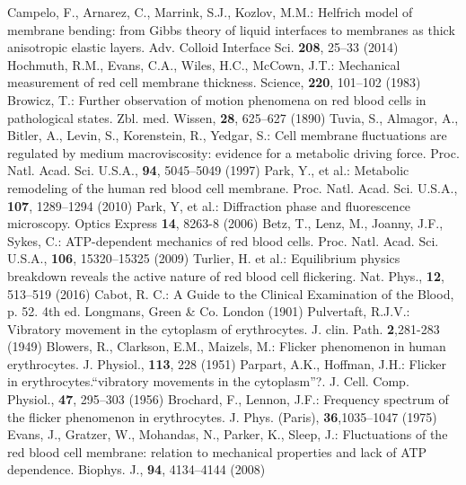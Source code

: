 \documentclass[graybox]{svmult}
\begin{document}
\begin{thebibliography}{99.}%
%
%
Campelo, F., Arnarez, C., Marrink, S.J., Kozlov, M.M.: Helfrich model of membrane bending: from Gibbs theory of liquid interfaces to membranes as thick anisotropic elastic layers. Adv. Colloid Interface Sci. \textbf{208}, 25--33 (2014)
%
Hochmuth, R.M., Evans, C.A., Wiles, H.C., McCown, J.T.: Mechanical measurement of red cell membrane thickness. Science, \textbf{220}, 101--102  (1983)
%
Browicz, T.: Further observation of motion phenomena on red blood cells in pathological states. Zbl. med. Wissen, \textbf{28}, 625--627 (1890)
%
Tuvia, S., Almagor, A., Bitler, A., Levin, S., Korenstein, R., Yedgar, S.: Cell membrane fluctuations are regulated by medium macroviscosity: evidence for a metabolic driving force. Proc. Natl. Acad. Sci. U.S.A., \textbf{94}, 5045--5049 (1997)
%
Park, Y., et al.: Metabolic remodeling of the human red blood cell membrane. Proc. Natl. Acad. Sci. U.S.A., \textbf{107}, 1289--1294 (2010)
%
Park, Y, et al.: Diffraction phase and fluorescence microscopy. Optics Express \textbf{14}, 8263-8 (2006)
%
Betz, T., Lenz, M., Joanny, J.F., Sykes, C.: ATP-dependent mechanics of red blood cells. Proc. Natl. Acad. Sci. U.S.A., \textbf{106}, 15320--15325 (2009)
%
Turlier, H. et al.: Equilibrium physics breakdown reveals the active nature of red blood cell flickering. Nat. Phys., \textbf{12}, 513--519 (2016)
%
Cabot, R. C.: A Guide to the Clinical Examination of the Blood,
p. 52. 4th ed. Longmans, Green \& Co. London (1901)
%
Pulvertaft, R.J.V.: Vibratory movement in the cytoplasm of erythrocytes. J. clin. Path. \textbf{2},281-283 (1949)
%
Blowers, R., Clarkson, E.M., Maizels, M.: Flicker phenomenon in human erythrocytes. J. Physiol., \textbf{113}, 228 (1951)
%
Parpart, A.K., Hoffman, J.H.: Flicker in erythrocytes.“vibratory movements in the cytoplasm”?. J. Cell. Comp. Physiol., \textbf{47}, 295--303 (1956)
%
Brochard, F., Lennon, J.F.: Frequency spectrum of the flicker phenomenon in erythrocytes. J. Phys. (Paris), \textbf{36},1035--1047 (1975)
%
Evans, J., Gratzer, W., Mohandas, N., Parker, K., Sleep, J.: Fluctuations of the red blood cell membrane: relation to mechanical properties and lack of ATP dependence. Biophys. J., \textbf{94}, 4134--4144 (2008)

\end{thebibliography}
\end{document}
